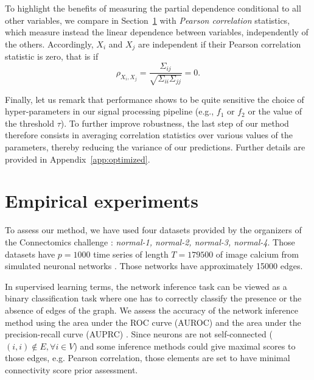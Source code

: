 \documentclass[wcp]{jmlr}
\begin{document}
To highlight the benefits of measuring the partial dependence conditional to
all other variables, we compare in Section~\ref{sec:results} with
\textit{Pearson correlation} statistics, which measure instead the linear dependence
between variables, independently of the others. Accordingly, $X_i$ and $X_j$ are
independent if their Pearson correlation statistic is zero, that is if
\begin{equation}
\rho_{X_i,X_j} = \frac{\Sigma_{ij}}{\sqrt{\Sigma_{ii} \Sigma_{jj}}} = 0.
\end{equation}

Finally, let us remark that performance shows to be quite sensitive the choice
of hyper-parameters in our signal processing pipeline (e.g., $f_1$ or $f_2$ or
the value of the threshold $\tau$). To further improve robustness, the last
step of our method therefore consists in averaging correlation statistics over
various values of the parameters, thereby reducing the variance of our
predictions. Further details are provided in Appendix~\ref{app:optimized}.

\section{Empirical experiments} \label{sec:results}

To assess our method, we have used four datasets provided by the organizers
of the Connectomics challenge : \textit{normal-1, normal-2, normal-3, normal-4}.
Those datasets have $p=1000$ time series of length $T=179500$ of image
calcium from simulated neuronal networks \citep{stetter2012model}. Those
networks have approximately 15000 edges.

In supervised learning terms, the network inference task can be viewed as a
binary classification task where one has to correctly classify the presence
or the absence of edges of the graph. We assess the accuracy of the
network inference method using the area under the ROC curve (AUROC)
and the area under the precision-recall curve (AUPRC)
\citep{schrynemackers2013protocols}. Since neurons are not self-connected
($(i, i) \not \in E, \forall i \in V$) and some inference methods could
give maximal scores to those edges, e.g. Pearson
correlation, those elements are set to have minimal connectivity score prior
assessment.
\end{document}
